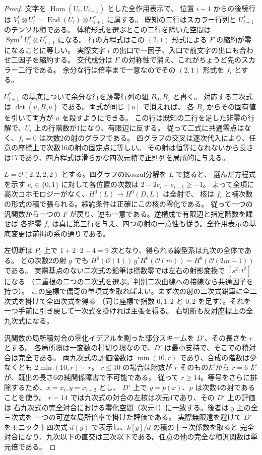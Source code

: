 \begin{proof}
文字を $\operatorname{Hom}(U_i,U_{i+1})$ とした全作用表示で、
位置 $i-1$ からの後続行は $V_i^*\otimes U_i^*=\operatorname{End}(U_i)\otimes U_{i+1}^*$ に属する。
既知の二行はスカラー行列と $U_{i+1}^*$ のテンソル積である。
体積形式を選ぶとこの二行を除いた空間は $\operatorname{Sym}^2 U_i^*\otimes U_{i+1}^*$ になる。
行の方程式はこの $(2,1)$ 形式による $F$ の縮約が零になることに等しい。
実際文字 $i$ の出口で一因子、入口で前文字の出口も合わせ二因子を縮約する。
交代成分は $F$ の対称性で消え、これがちょうど先のスカラー二行である。
余分な行は倍率まで一意なのでその $(2,1)$ 形式を $f_i$ とする。

$U_{i+1}^*$ の基底について余分な行を跡零行列の組 $B_0,B_1$ と書く。
対応する二次式は $\det(u,B_j u)$ である。両式が同じ $[u]$ で消えれば、
各 $B_j$ からその固有値を引いて両方が $u$ を殺すようにできる。
この行は既知の二行を足した非零の行解で、$U_i$ 上の行階数が1になり、有限辺に反する。
従って二式に共通零点はなく、$f_i=0$ は次数2の射のグラフである。
四グラフの交叉は逐次代入により、任意の座標上で次数16の射の固定点に等しい。
その射は恒等になれないから長さは17であり、四方程式は滑らかな四次元積で正則列を局所的に与える。

$L=\mathcal O(2,2,2,2)$ とする。四グラフのKoszul分解を $L$ で捻ると、
選んだ方程式を示す $e_i\in\{0,1\}$ に対して各位置の次数は $2-2e_i-e_{i-1}\ge-1$。
よって全項に高次コホモロジーがなく、$H^0(L)\to H^0(D,L)$ は全射で、
核は $f_i$ と補次数の形式の積で張られる。縮約条件は正確にこの核の零化である。
従って一つの汎関数から一つの $F$ が戻り、逆も一意である。逆構成で有限辺と指定階数を課せば
各非零 $f_i$ は真に第三行を与え、四つの射の一意性も従う。全作用表示の基底変更は前掲の系の通りである。

左切断は $P_i$ 上で $1+2\cdot2+4=9$ 次となり、得られる線型系は九次の全体である。
どの次数2の射 $g$ でも $H^0(\mathcal O(1))\,g^*H^0(\mathcal O(m))=H^0(\mathcal O(2m+1))$ である。
実際基点のない二次式の鉛筆は標数零では左右の射影変換で $[s^2:t^2]$ になる
（二重根の二つの二次式を選ぶ。判別二次曲線への接線なら共通因子を持つ）。
この座標で偶奇の単項式を取ればよい。まず次の射の二次式鉛筆に全二次式を掛けて全四次式を得る
（同じ座標で指数 $0,1,2$ と $0,2$ を足す）。それを一つ手前に引き戻して一次式を掛ければ主張を得る。
右切断も反対座標上の全九次式になる。

汎関数の局所積対合の零化イデアルを割った部分スキームを $D'$、その長さを $r$ とする。
各局所環は一変数の打切り環なので、$D'$ は最小支持で、そこでの積対合は完全である。
両九次式の評価階数は $\min(10,r)$ であり、合成の階数は少なくとも $2\min(10,r)-r$。
$r\le10$ の場合は階数が $r$ そのものだから $r=6$ だが、既出の長さ6の純関係障害で不可能である。
従って $r\ge14$。等号をさらに排除するため、$x=x_i,y=x_{i+2}$ とし、
$D'$ 上で $y=p(x)$、$p$ は次数4の射であることを使う。
$r=14$ では九次式の対合の左核は次元4であり、その $D'$ 上の評価は
右九次式の完全対合における零化空間（次元4）に一致する。後者は $y$ 上の全三次式を
一つの可逆な局所倍率で掛けた評価である。
実際無限遠を避けて $D'$ をモニック十四次式 $d(y)$ で表示し、$k[y]/d$ の積の十三次係数を取ると
完全対合になり、九次以下の直交は三次以下である。任意の他の完全な積汎関数は単元倍である。


\end{proof}
